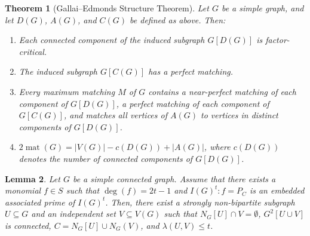 \documentclass[12pt,reqno,twoside]{amsart}
\newtheorem{thm}{\bf Theorem}[section]
\newtheorem{lem}[thm]{\bf Lemma}
\theoremstyle{definition}
\theoremstyle{plain}
\theoremstyle{remark}
\numberwithin{equation}{section}
\begin{document}
\begin{thm}[Gallai--Edmonds Structure Theorem]\label{thm_GE}
Let $G$ be a simple graph, and let $D(G)$, $A(G)$, and $C(G)$ be defined as above. Then:
\begin{enumerate}
    \item Each connected component of the induced subgraph $G[D(G)]$ is factor-critical.
    \item The induced subgraph $G[C(G)]$ has a perfect matching.
    \item Every maximum matching $M$ of $G$ contains a near-perfect matching of each component of $G[D(G)]$, a perfect matching of each component of $G[C(G)]$, and matches all vertices of $A(G)$ to vertices in distinct components of $G[D(G)]$.
    \item $2\operatorname{mat}(G) = |V(G)| - c(D(G)) + |A(G)|$, where $c(D(G))$ denotes the number of connected components of $G[D(G)]$.
\end{enumerate}
\end{thm}

\begin{lem}\label{lem_construct_U_V} 
Let $G$ be a simple connected graph. Assume that there exists a monomial $f \in S$ such that $\deg(f) = 2t-1$ and $I(G)^t : f = P_C$ is an embedded associated prime of $I(G)^t$. Then, there exist a strongly non-bipartite subgraph $U \subseteq G$ and an independent set $V \subseteq V(G)$ such that $N_G[U] \cap V = \emptyset$, $G^2[U \cup V]$ is connected, $C = N_G[U] \cup N_G(V)$, and $\lambda(U,V) \le t$. 
\end{lem}
\end{document}
